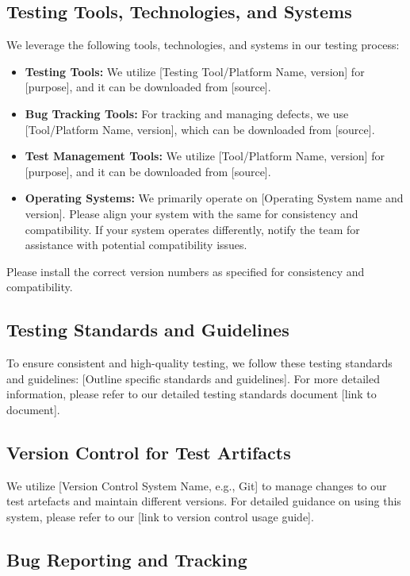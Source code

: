 \documentclass[10pt]{projectdoc}
\begin{document}
\subsection{Testing Tools, Technologies, and Systems}

We leverage the following tools, technologies, and systems in our testing process:

\begin{itemize}
\item \textbf{Testing Tools:} We utilize [Testing Tool/Platform Name, version] for [purpose], and it can be downloaded from [source].
\item \textbf{Bug Tracking Tools:} For tracking and managing defects, we use [Tool/Platform Name, version], which can be downloaded from [source].
\item \textbf{Test Management Tools:} We utilize [Tool/Platform Name, version] for [purpose], and it can be downloaded from [source].
\item \textbf{Operating Systems:} We primarily operate on [Operating System name and version]. Please align your system with the same for consistency and compatibility. If your system operates differently, notify the team for assistance with potential compatibility issues.
\end{itemize}

Please install the correct version numbers as specified for consistency and compatibility.

\subsection{Testing Standards and Guidelines}

To ensure consistent and high-quality testing, we follow these testing standards and guidelines: [Outline specific standards and guidelines]. For more detailed information, please refer to our detailed testing standards document [link to document].

\subsection{Version Control for Test Artifacts}

We utilize [Version Control System Name, e.g., Git] to manage changes to our test artefacts and maintain different versions. For detailed guidance on using this system, please refer to our [link to version control usage guide].

\subsection{Bug Reporting and Tracking}
\end{document}
